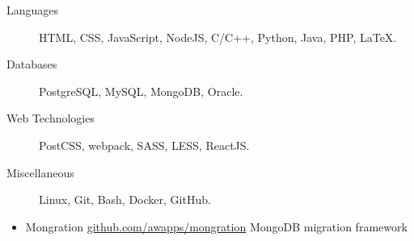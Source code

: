 \documentclass[letterpaper,11pt]{article}
\begin{document}
    \begin{description}
        \item[Languages]
            HTML, CSS, JavaScript, NodeJS, C/C++, Python, Java, PHP, \LaTeX.
        \item[Databases]
            PostgreSQL, MySQL, MongoDB, Oracle.
        \item[Web Technologies]
            PostCSS, webpack, SASS, LESS, ReactJS.
        \item[Miscellaneous]
            Linux, Git, Bash, Docker, GitHub.
    \end{description}

    \begin{itemize}
        \item
            \ressubheading
                {Mongration}
                {\href{https://github.com/awapps/mongration}{github.com/awapps/mongration}}
                {MongoDB migration framework}
                {}
    \end{itemize}
\end{document}
